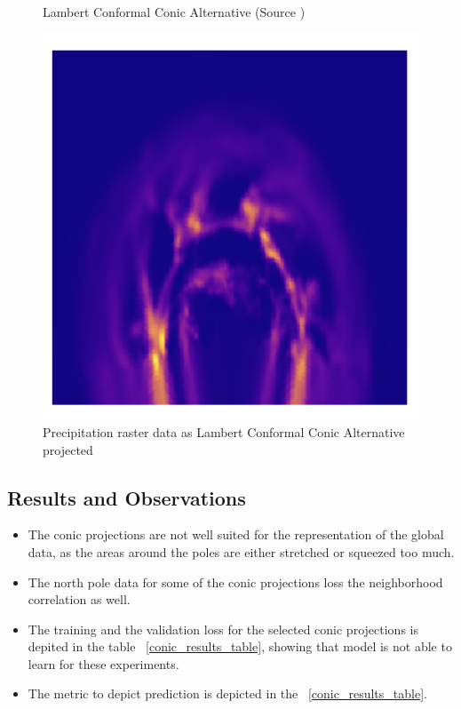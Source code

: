 \begin{figure}[h]
\begin{minipage}{0.30\textwidth}
        \caption{Lambert Conformal Conic Alternative (Source \cite{PROJ_SITE})}
        \label{fig:lcca_proj}
    \end{minipage}\hfill
    \begin{minipage}{0.30\textwidth}
        \centering
        \includegraphics[width=0.9\linewidth]{figures/chapter-8/prect_lcca.png}
        \caption{Precipitation raster data as Lambert Conformal Conic Alternative projected}
        \label{fig:lcca_prect_raster}
    \end{minipage}\hfill
\end{figure}

\subsection{Results and Observations}
\begin{itemize}
    \item The conic projections are not well suited for the representation of the global data, as the areas around the poles are either stretched or squeezed too much.
    \item The north pole data for some of the conic projections loss the neighborhood correlation as well.
    \item The training and the validation loss for the selected conic projections is depited in the table ~\ref{conic_results_table}, showing that model is not able to learn for these experiments.
    \item The metric to depict prediction is depicted in the ~\ref{conic_results_table}.
\end{itemize}

